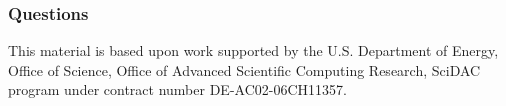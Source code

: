 \documentclass[aspectratio=169]{beamer}
\begin{document}
\begin{frame}
  \frametitle{Questions}
  \tableofcontents
  \bigskip

\par
{\tiny This material is based upon work supported by the U.S. Department of Energy, Office of Science, Office of Advanced Scientific Computing Research, SciDAC program under contract number DE-AC02-06CH11357.}\par

\end{frame}
\end{document}

